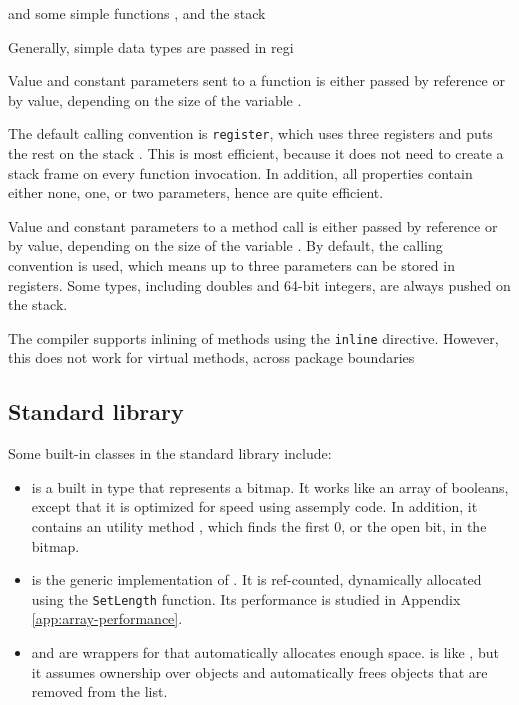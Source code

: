 and some simple functions
, and the stack 

Generally, simple data types are passed in regi

Value and constant parameters sent to a function is either passed by reference or by value, depending on the size of the variable \cite{noauthor_undated-ae}.

The default calling convention is \texttt{register}, which uses three registers and puts the rest on the stack \cite{noauthor_undated-xi}. This is most efficient, because it does not need to create a stack frame on every function invocation. In addition, all properties contain either none, one, or two parameters, hence are quite efficient. 

Value and constant parameters to a method call is either passed by reference or by value, depending on the size of the variable \cite{noauthor_undated-ae}. By default, the  calling convention is used, which means up to three parameters can be stored in registers. Some types, including doubles and 64-bit integers, are always pushed on the stack.

The compiler supports inlining of methods using the \texttt{inline} directive. However, this does not work for virtual methods, across package boundaries \cite{noauthor_undated-rx} 


\subsection{Standard library}
\label{sub:Standard library}
Some built-in classes in the standard library include:
\begin{itemize}
    \item {} is a built in type that represents a bitmap. It works like an array of booleans, except that it is optimized for speed using assemply code. In addition, it contains an utility method , which finds the first 0, or the open bit, in the bitmap.
    \item {} is the generic implementation of . It is ref-counted, dynamically allocated using the \texttt{SetLength} function. Its performance is studied in Appendix \ref{app:array-performance}.
    \item {} and  are wrappers for  that automatically allocates enough space.  is like , but it assumes ownership over objects and automatically frees objects that are removed from the list.
\end{itemize}

